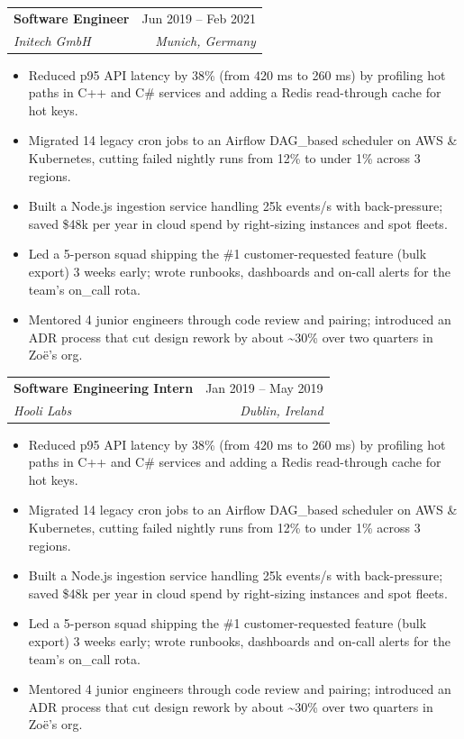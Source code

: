 \documentclass[10pt]{article}
\makeatletter
\newcommand{\resumeEntry}[4]{%
  \begin{tabularx}{\linewidth}{@{}X r@{}}
    \textbf{#1} & \small #2\\
    \textit{\small #3} & \textit{\small #4}
  \end{tabularx}\vspace{-2pt}}
\newenvironment{resumeItems}{\begin{itemize}\small}{\end{itemize}\vspace{2pt}}
\newcommand{\resumeItem}[1]{\item #1}
\makeatother
\begin{document}
\resumeEntry{Software Engineer}{Jun 2019 -- Feb 2021}{Initech GmbH}{Munich, Germany}
\begin{resumeItems}
  \resumeItem{Reduced p95 API latency by 38\% (from 420 ms to 260 ms) by profiling hot paths in C++ and C\# services and adding a Redis read-through cache for hot keys.}
  \resumeItem{Migrated 14 legacy cron jobs to an Airflow DAG\_based scheduler on AWS \& Kubernetes, cutting failed nightly runs from 12\% to under 1\% across 3 regions.}
  \resumeItem{Built a Node.js ingestion service handling 25k events/s with back-pressure; saved \$48k per year in cloud spend by right-sizing instances and spot fleets.}
  \resumeItem{Led a 5-person squad shipping the \#1 customer-requested feature (bulk export) 3 weeks early; wrote runbooks, dashboards and on-call alerts for the team's on\_call rota.}
  \resumeItem{Mentored 4 junior engineers through code review and pairing; introduced an ADR process that cut design rework by about \textasciitilde{}30\% over two quarters in Zo\"e's org.}
\end{resumeItems}
\resumeEntry{Software Engineering Intern}{Jan 2019 -- May 2019}{Hooli Labs}{Dublin, Ireland}
\begin{resumeItems}
  \resumeItem{Reduced p95 API latency by 38\% (from 420 ms to 260 ms) by profiling hot paths in C++ and C\# services and adding a Redis read-through cache for hot keys.}
  \resumeItem{Migrated 14 legacy cron jobs to an Airflow DAG\_based scheduler on AWS \& Kubernetes, cutting failed nightly runs from 12\% to under 1\% across 3 regions.}
  \resumeItem{Built a Node.js ingestion service handling 25k events/s with back-pressure; saved \$48k per year in cloud spend by right-sizing instances and spot fleets.}
  \resumeItem{Led a 5-person squad shipping the \#1 customer-requested feature (bulk export) 3 weeks early; wrote runbooks, dashboards and on-call alerts for the team's on\_call rota.}
  \resumeItem{Mentored 4 junior engineers through code review and pairing; introduced an ADR process that cut design rework by about \textasciitilde{}30\% over two quarters in Zo\"e's org.}
\end{resumeItems}
\end{document}
